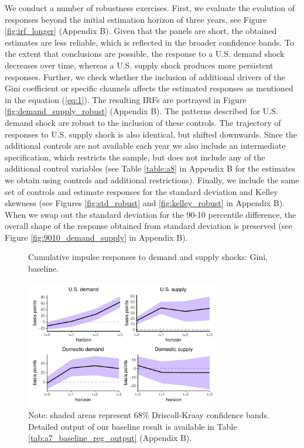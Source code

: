 \documentclass[12pt, a4paper]{article}
\begin{document}
We conduct a number of robustness exercises. First, we evaluate the evolution of responses beyond the initial estimation horizon of three years, see Figure \ref{fig:irf_longer} (Appendix B). Given that the panels are short, the obtained estimates are less reliable, which is reflected in the broader confidence bands. To the extent that conclusions are possible, the response to a U.S. demand shock decreases over time, whereas a U.S. supply shock produces more persistent responses. Further, we check whether the inclusion of additional drivers of the Gini coefficient or specific channels affects the estimated responses as mentioned in the equation (\ref{eq:1}). The resulting IRFs are portrayed in Figure \ref{fig:demand_supply_robust} (Appendix B). The patterns described for U.S. demand shock are robust to the inclusion of these controls. The trajectory of responses to U.S. supply shock is also identical, but shifted downwards. Since the additional controls are not available each year we also include an intermediate specification, which restricts the sample, but does not include any of the additional control variables (see Table \ref{table:a8} in Appendix B for the estimates we obtain using controls and additional restrictions). Finally, we include the same set of controls and estimate responses for the standard deviation and Kelley skewness (see Figures \ref{fig:std_robust} and \ref{fig:kelley_robust} in Appendix B). When we swap out the standard deviation for the 90-10 percentile difference, the overall shape of the response obtained from standard deviation is preserved (see Figure \ref{fig:9010_demand_supply} in Appendix B).

\begin{figure}[H]
    \centering    
    \caption{Cumulative impulse responses to demand and supply shocks: Gini, baseline.}  
    \label{fig:demand_supply_base}
    \includegraphics[width=0.75\textwidth]{Figures/baseline_demand_supply_LP_extended.pdf}
    \centering \caption*{Note: shaded areas represent 68\% Driscoll-Kraay confidence bands. Detailed output of our baseline result is available in Table \ref{tab:a7_baseline_reg_output} (Appendix B).}
\end{figure}
\end{document}
